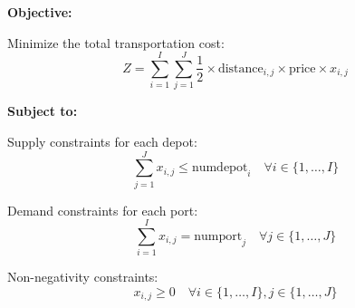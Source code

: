 \documentclass{article}
\begin{document}
\textbf{Objective:}

Minimize the total transportation cost:
\[
Z = \sum_{i=1}^{I} \sum_{j=1}^{J} \frac{1}{2} \times \text{distance}_{i,j} \times \text{price} \times x_{i,j}
\]

\textbf{Subject to:}

Supply constraints for each depot:
\[
\sum_{j=1}^{J} x_{i,j} \leq \text{numdepot}_i \quad \forall i \in \{1, \ldots, I\}
\]

Demand constraints for each port:
\[
\sum_{i=1}^{I} x_{i,j} = \text{numport}_j \quad \forall j \in \{1, \ldots, J\}
\]

Non-negativity constraints:
\[
x_{i,j} \geq 0 \quad \forall i \in \{1, \ldots, I\}, j \in \{1, \ldots, J\}
\]
\end{document}
